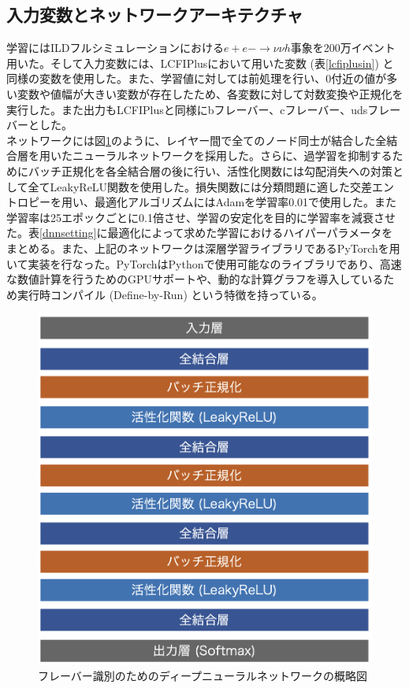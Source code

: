\subsection{入力変数とネットワークアーキテクチャ}
学習にはILDフルシミュレーションにおける$e+e- \rightarrow \nu\nu h$事象を200万イベント用いた。そして入力変数には、LCFIPlusにおいて用いた変数 (表\ref{lcfiplusin}) と同様の変数を使用した。また、学習値に対しては前処理を行い、0付近の値が多い変数や値幅が大きい変数が存在したため、各変数に対して対数変換や正規化を実行した。また出力もLCFIPlusと同様にbフレーバー、cフレーバー、udsフレーバーとした。\\
ネットワークには図\ref{dnnmodel}のように、レイヤー間で全てのノード同士が結合した全結合層を用いたニューラルネットワークを採用した。さらに、過学習を抑制するためにバッチ正規化を各全結合層の後に行い、活性化関数には勾配消失への対策として全てLeakyReLU関数を使用した。損失関数には分類問題に適した交差エントロピーを用い、最適化アルゴリズムにはAdamを学習率0.01で使用した。また学習率は25エポックごとに0.1倍させ、学習の安定化を目的に学習率を減衰させた。表\ref{dnnsetting}に最適化によって求めた学習におけるハイパーパラメータをまとめる。また、上記のネットワークは深層学習ライブラリであるPyTorchを用いて実装を行なった。PyTorchはPythonで使用可能なのライブラリであり、高速な数値計算を行うためのGPUサポートや、動的な計算グラフを導入しているため実行時コンパイル (Define-by-Run) という特徴を持っている。
\begin{figure}[H]
	\begin{center}
 \includegraphics[keepaspectratio, scale=0.35]
 	{Figure/Flavortagging/dnn.png}
 		\caption{フレーバー識別のためのディープニューラルネットワークの概略図}
 		\label{dnnmodel}
	\end{center}
\end{figure}

